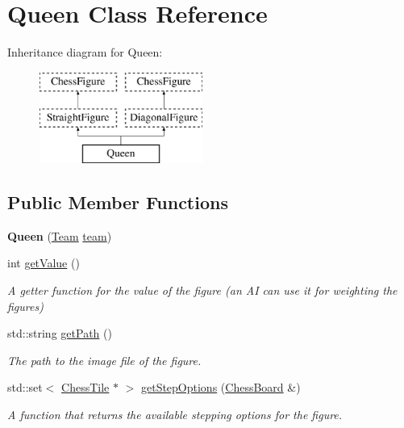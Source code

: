 \hypertarget{classQueen}{}\section{Queen Class Reference}
\label{classQueen}
Inheritance diagram for Queen\+:\begin{figure}[H]
\begin{center}
\leavevmode
\includegraphics[height=3.000000cm]{classQueen}
\end{center}
\end{figure}
\subsection*{Public Member Functions}
\begin{DoxyCompactItemize}
\item 
\mbox{\label{classQueen_aff683860a39f6b0e4c19505f8e28706f}} 
{\bfseries Queen} (\mbox{\hyperlink{classChessFigure_a62f54318c1f28a08e6a6a2707f697a1d}{Team}} \mbox{\hyperlink{classChessFigure_ac7d0751a28c94d49927b9524390d1261}{team}})
\item 
\mbox{\label{classQueen_a88e9312353dc2443ad658de7495b86b8}} 
int \mbox{\hyperlink{classQueen_a88e9312353dc2443ad658de7495b86b8}{get\+Value}} ()
\begin{DoxyCompactList}\small\item\em A getter function for the value of the figure (an AI can use it for weighting the figures) \end{DoxyCompactList}\item 
\mbox{\label{classQueen_a0f41324a91413c415b1cf19fb52447c4}} 
std\+::string \mbox{\hyperlink{classQueen_a0f41324a91413c415b1cf19fb52447c4}{get\+Path}} ()
\begin{DoxyCompactList}\small\item\em The path to the image file of the figure. \end{DoxyCompactList}\item 
std\+::set$<$ \mbox{\hyperlink{classChessTile}{Chess\+Tile}} $\ast$ $>$ \mbox{\hyperlink{classQueen_a0fe4b1feaa74c1b2879ce991771054b0}{get\+Step\+Options}} (\mbox{\hyperlink{classChessBoard}{Chess\+Board}} \&)
\begin{DoxyCompactList}\small\item\em A function that returns the available stepping options for the figure. \end{DoxyCompactList}\end{DoxyCompactItemize}
